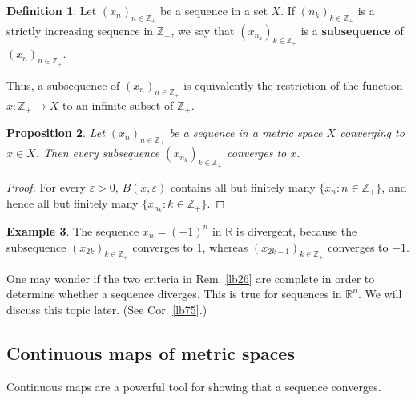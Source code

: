 \documentclass[12pt,b5paper,notitlepage]{article}
\theoremstyle{definition}
\newtheorem{df}{Definition}[section]
\newtheorem{eg}[df]{Example}
\theoremstyle{plain}
\newtheorem{pp}[df]{Proposition}
\newcommand{\Zbb}{\mathbb Z}
\newcommand{\Rbb}{\mathbb R}
\numberwithin{equation}{section}
\begin{document}
\begin{df}
Let $(x_n)_{n\in\Zbb_+}$ be a sequence in a set $X$. If $(n_k)_{k\in\Zbb_+}$ is a strictly increasing sequence in $\Zbb_+$, we say that $(x_{n_k})_{k\in\Zbb_+}$ is a \textbf{subsequence} of $(x_n)_{n\in\Zbb_+}$. 
\end{df}



Thus, a subsequence of $(x_n)_{n\in\Zbb_+}$ is equivalently the restriction of the function $x:\Zbb_+\rightarrow X$ to an infinite subset of $\Zbb_+$.

\begin{pp}\label{lb23}
Let $(x_n)_{n\in\Zbb_+}$ be a sequence in a metric space $X$ converging to $x\in X$. Then every subsequence $(x_{n_k})_{k\in\Zbb_+}$ converges to $x$.
\end{pp}

\begin{proof}
For every $\varepsilon>0$, $B(x,\varepsilon)$ contains all but finitely many $\{x_n:n\in\Zbb_+\}$, and hence all but finitely many $\{x_{n_k}:k\in\Zbb_+\}$.
\end{proof}

\begin{eg}\label{lb25}
The sequence $x_n=(-1)^n$ in $\Rbb$ is divergent, because the subsequence $(x_{2k})_{k\in\Zbb_+}$ converges to $1$, whereas $(x_{2k-1})_{k\in\Zbb_+}$ converges to $-1$. 
\end{eg}




One may wonder if the two criteria in Rem. \ref{lb26} are complete in order to determine whether a sequence diverges. This is true for sequences in $\Rbb^n$. We will discuss this topic later. (See Cor. \ref{lb75}.)



\subsection{Continuous maps of metric spaces}

Continuous maps are a powerful tool for showing that a sequence converges.
\end{document}
